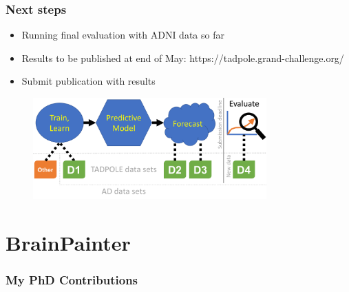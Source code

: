 \documentclass[8pt,xcolor=table]{beamer}
\begin{document}
\begin{frame}
\frametitle{Next steps}

\begin{itemize}
\item Running final evaluation with ADNI data so far
\item Results to be published at end of May: https://tadpole.grand-challenge.org/
\item Submit publication with results
\end{itemize}

\begin{figure}
 \centering
 \includegraphics[width=0.8\textwidth]{Figure_TrainForecast_new}
\end{figure}
\end{frame}

\section{BrainPainter}

\begin{frame}
\frametitle{My PhD Contributions}


\begin{figure}
\centering

{ \ovEBM 
\ovVWDPM 
\vspace{-1em}

\ovDKT
\ovTadpole}

\ovPainter


\end{figure}

\end{frame}
\end{document}
